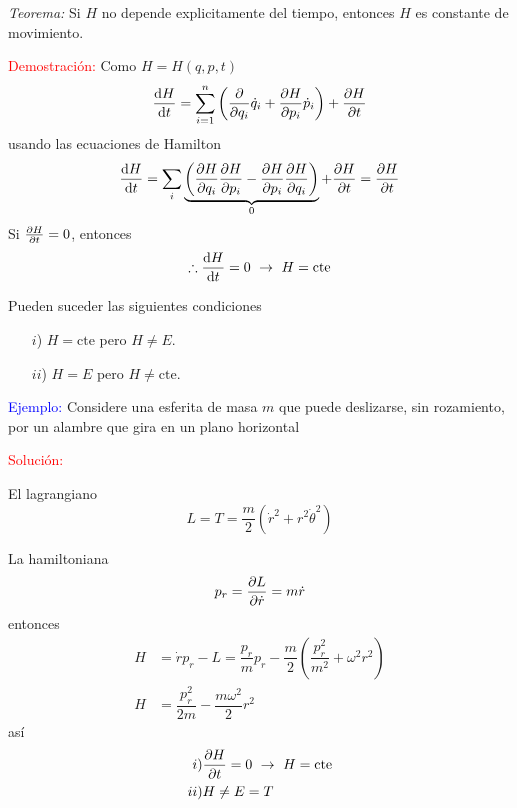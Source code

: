 \documentclass[../main]{subfiles}
\begin{document}
\textit{Teorema:} Si $H$ no depende explicitamente del tiempo, entonces $H$ es constante de movimiento.

\textcolor{red}{Demostración:} Como $H=H(q, p, t)$
\begin{equation}
    \dv{H}{t}=\sum_{i=1}^n\left(\pdv{}{q_i}\dot{q}_i+\pdv{H}{p_i}\dot{p}_i\right)+\pdv{H}{t}
\end{equation}
usando las ecuaciones de Hamilton 
\begin{equation}
    \dv{H}{t}=\sum_i \underbrace{\left(\pdv{H}{q_i}\pdv{H}{p_i}-\pdv{H}{p_i}\pdv{H}{q_i}\right)}_{0}+\pdv{H}{t}=\pdv{H}{t}
\end{equation}
Si $\pdv{H}{t}=0$, entonces
\begin{equation}
    \therefore \dv{H}{t}=0 \ \rightarrow \ H=\text{cte}
\end{equation}

Pueden suceder las siguientes condiciones 
\begin{enumerate}
    \item[$i$)] $H=\text{cte}$ pero $H\neq E$.
    \item[$ii$)] $H=E$ pero $H\neq \text{cte}$. 
\end{enumerate}

\textcolor{blue}{Ejemplo:} Considere una esferita de masa $m$ que puede deslizarse, sin rozamiento, por un alambre que gira en un plano horizontal 

\textcolor{red}{Solución:}

El lagrangiano 
\begin{equation}
    L=T=\dfrac{m}{2}(\dot{r}^2+r^2\dot{\theta}^2)
\end{equation}

La hamiltoniana 
\begin{equation}
    p_r=\pdv{L}{\dot{r}}=m\dot{r}
\end{equation}
entonces 
\begin{equation}
    \begin{split}
        H&=\dot{r}p_r-L=\dfrac{p_r}{m}p_r-\dfrac{m}{2}\left(\dfrac{p^2_r}{m^2}+\omega^2 r^2\right)\\
        H&=\dfrac{p^2_r}{2m}-\dfrac{m\omega^2}{2}r^2
    \end{split}
\end{equation}
así 
\begin{align*}
    i&) \pdv{H}{t}=0 \ \rightarrow \ H=\text{cte}\\
    ii&) H\neq E=T
\end{align*}
\end{document}
